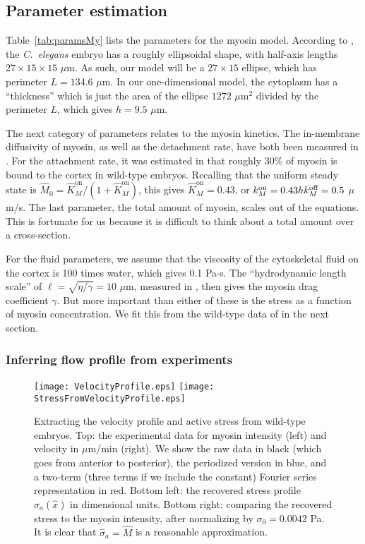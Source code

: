 \documentclass[11pt]{article}
\newcommand{\6}[1]{#1_{\text{6}}}
\newcommand{\3}[1]{#1_{\text{3}}}
\begin{document}
\subsection{Parameter estimation}
Table\ \ref{tab:paramsMy} lists the parameters for the myosin model. According to \cite{goehring2011polarization}, the \emph{C.\ elegans} embryo has a roughly ellipsoidal shape, with half-axis lengths $27 \times 15 \times 15$ $\mu$m. As such, our model will be a $27 \times 15$ ellipse, which has perimeter $L=134.6$ $\mu$m. In our one-dimensional model, the cytoplasm has a ``thickness'' which is just the area of the ellipse $1272$ $\mu$m$^2$ divided by the perimeter $L$, which gives $h=9.5$ $\mu$m.

The next category of parameters relates to the myosin kinetics. The in-membrane diffusivity of myosin, as well as the detachment rate, have both been measured in \cite{gross2019guiding}. For the attachment rate, it was estimated in \cite[Fig.~S3m]{gross2019guiding} that roughly 30\% of myosin is bound to the cortex in wild-type embryos. Recalling that the uniform steady state is $\hat M_0=\hat{K}^\text{on}_M/\left(1+\hat{K}^\text{on}_M\right)$, this gives $\hat{K}^\text{on}_M=0.43$, or $k^\text{on}_M = 0.43hk^\text{off}_M=0.5$ $\mu$m/s. The last parameter, the total amount of myosin, scales out of the equations. This is fortunate for us because it is difficult to think about a total amount over a cross-section. 

For the fluid parameters, we assume that the viscosity of the cytoskeletal fluid on the cortex is 100 times water, which gives 0.1 Pa$\cdot$s. The ``hydrodynamic length scale'' of $\ell=\sqrt{\eta/\gamma}=10$ $\mu$m, measured in \cite{mayer2010anisotropies, saha2016determining}, then gives the myosin drag coefficient $\gamma$. But more important than either of these is the stress as a function of myosin concentration. We fit this from the wild-type data of \cite{sailer2015dynamic} in the next section.

\subsubsection{Inferring flow profile from experiments \label{sec:MyVelFit}}
\begin{figure}
\centering
\texttt{[image: VelocityProfile.eps]}
\texttt{[image: StressFromVelocityProfile.eps]}
\caption{\label{fig:VelProf} Extracting the velocity profile and active stress from wild-type embryos. Top: the experimental data for myosin intensity (left) and velocity in $\mu$m/min (right). We show the raw data in black (which goes from anterior to posterior), the periodized version in blue, and a two-term (three terms if we include the constant) Fourier series representation in red. Bottom left: the recovered stress profile $\sigma_a(\hat x)$ in dimensional units. Bottom right: comparing the recovered stress to the myosin intensity, after normalizing by $\sigma_0=0.0042$ Pa. It is clear that $\hat \sigma_a = \hat M$ is a reasonable approximation.}
\end{figure}
\end{document}
